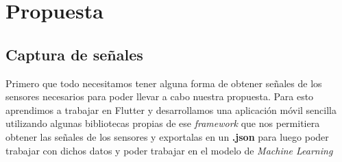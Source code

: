 \chapter{Propuesta}\label{chapter:proposal}

\section*{Captura de señales}
	Primero que todo necesitamos tener alguna forma de obtener señales de los sensores necesarios 
	para poder llevar a cabo nuestra propuesta. Para esto aprendimos a trabajar en Flutter y 
	desarrollamos una aplicación móvil sencilla utilizando algunas bibliotecas propias de ese 
	\emph{framework} que nos permitiera obtener las señales de los sensores y exportalas en un
	{\bf .json} para luego poder trabajar con dichos datos y poder trabajar en el modelo de 
	\emph{Machine Learning}
